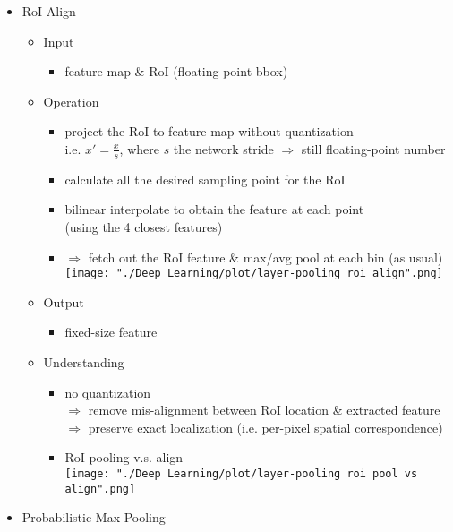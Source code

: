 \begin{itemize}
\item RoI Align
	\begin{itemize}
	\item Input
		\begin{itemize}
		\item feature map \& RoI (floating-point bbox)
		\end{itemize}
	\item Operation
		\begin{itemize}
		\item project the RoI to feature map without quantization \\
		i.e. $x'=\frac{x}{s}$, where $s$ the network stride $\Rightarrow$ still floating-point number
		\item calculate all the desired sampling point for the RoI
		\item bilinear interpolate to obtain the feature at each point \\
		(using the 4 closest features)
		\item $\Rightarrow$ fetch out the RoI feature \& max/avg pool at each bin (as usual) \\
		\texttt{[image: "./Deep Learning/plot/layer-pooling roi align".png]}
		\end{itemize}
	\item Output
		\begin{itemize}
		\item fixed-size feature
		\end{itemize}
	\item Understanding
		\begin{itemize}
		\item \underline{no quantization} \\
		$\Rightarrow$ remove mis-alignment between RoI location \& extracted feature \\
		$\Rightarrow$ preserve exact localization (i.e. per-pixel spatial correspondence)
		\item RoI pooling v.s. align \\
		\texttt{[image: "./Deep Learning/plot/layer-pooling roi pool vs align".png]}
		\end{itemize}
	\end{itemize}

\item Probabilistic Max Pooling
\end{itemize}
